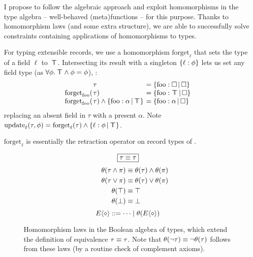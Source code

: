 I propose to follow the algebraic approach and exploit homomorphisms in the type algebra -- well-behaved (meta)functions -- for this purpose. Thanks to homomorphism laws (and some extra structure), we are able to successfully solve constraints containing applications of homomorphisms to types.
\begin{example}
    For typing extensible records, we use a homomorphism $\mathrm{forget}_\ell$ that sets the type of a field $\ell$ to~$\top \!\!\!\! \top$.
    Intersecting its result with a singleton $\flrec{\ell : \phi}$ lets us set any field type (as $\forall \phi \ldotp \top \!\!\!\! \top \land \phi = \phi$), \eg{}:
    \setlength{\tabcolsep}{0pt}
    $$\begin{array}{rll}
        &\hspace{-0.9em}\tau &\;\hspace{-0.9em}= \flext{\mathrm{foo}: \flabsent}{\flabsent} \\
        \mathrm{forget}_\mathrm{foo}( &\hspace{-0.9em}\tau ) &\;\hspace{-0.9em}= \flext{\mathrm{foo}: \flftop}{\flabsent} \\
        \mathrm{forget}_\mathrm{foo}( &\hspace{-0.9em}\tau ) \meet \flext{\mathrm{foo}: \alpha}{\flftop} &\;\hspace{-0.9em}= \flext{\mathrm{foo}: \alpha}{\flabsent}
    \end{array}$$
    replacing an absent field in $\tau$ with a present $\alpha$. Note $\mathrm{update}_\ell(\tau, \phi) = \mathrm{forget}_\ell(\tau) \meet \flext{ \ell : \phi }{\flftop}$.

    $\mathrm{forget}_\ell$ is essentially the retraction operator on record types of \textcite{operations-on-records}.
\end{example}

\begin{figure}
    \centering
    $$\boxed{\tau \equiv \tau}$$
    \vspace{-2.5em}
    \begin{align*}
        \quad\quad\theta(\tau \land \pi) &\equiv \theta(\tau) \land \theta(\pi) \\
        \theta(\tau \lor \pi) &\equiv \theta(\tau) \lor \theta(\pi) \\
        \theta(\top) &\equiv \top \\
        \theta(\bot) &\equiv \bot
    \end{align*}
    \vspace{-1.5em}
    $$ \equivctx ::= \cdots \mid \morph(\equivctx) $$
    \caption{Homomorphism laws in the Boolean algebra of types, which extend the definition of equivalence $\tau \equiv \tau$. Note that $\theta(\lnot \tau) \equiv \lnot \theta(\tau)$ follows from these laws (by a routine check of complement axioms).}
    \label{fig:morphism-laws}
\end{figure}

